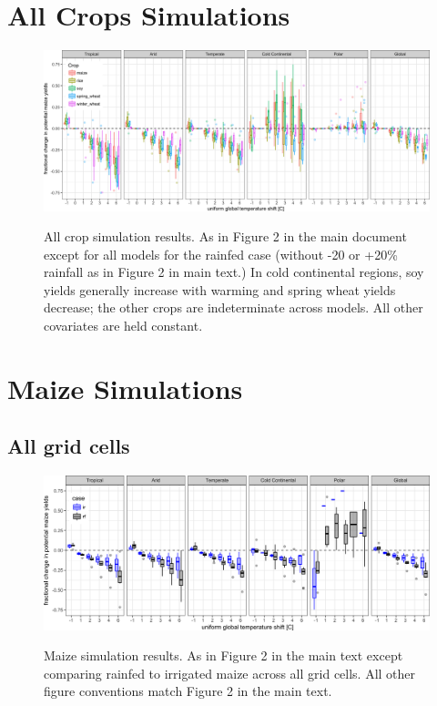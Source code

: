 \documentclass[10pt]{article}
\begin{document}
\section{All Crops Simulations}
\begin{figure}[h!]
\includegraphics[width=\textwidth]{s_sim_KG_crops_all.png}\\
\caption{All crop simulation results. As in Figure 2 in the main document except for all models for the rainfed case (without -20 or +20\% rainfall as in Figure 2 in main text.) In cold continental regions, soy yields generally increase with warming and spring wheat yields decrease; the other crops are indeterminate across models. All other covariates are held constant.}
\label{fig:KGcrops_all}
\end{figure}

\clearpage
\section{Maize Simulations}
\subsection{All grid cells}
\begin{figure}[h!]
\includegraphics[width=\textwidth]{s_maize_sim_CG.png}\\
\caption{Maize simulation results. As in Figure 2 in the main text except comparing rainfed to irrigated maize across all grid cells. All other figure conventions match Figure 2 in the main text.}
\label{fig:maizeCG}
\end{figure}
\end{document}
